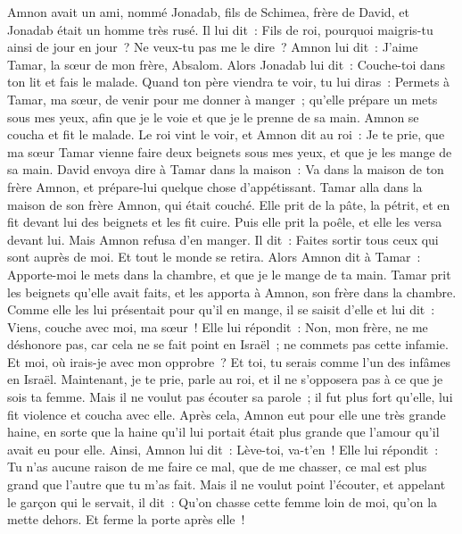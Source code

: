 \begin{multicols}{2}
Amnon avait un ami, nommé Jonadab, fils de Schimea, frère de David, et Jonadab était un homme très rusé.
Il lui dit~: Fils de roi, pourquoi maigris-tu ainsi de jour en jour~? Ne veux-tu pas me le dire~? Amnon lui dit~: J'aime Tamar, la sœur de mon frère, Absalom.
Alors Jonadab lui dit~: Couche-toi dans ton lit et fais le malade. Quand ton père viendra te voir, tu lui diras~: Permets à Tamar, ma sœur, de venir pour me donner à manger~; qu'elle prépare un mets sous mes yeux, afin que je le voie et que je le prenne de sa main.
Amnon se coucha et fit le malade. Le roi vint le voir, et Amnon dit au roi~: Je te prie, que ma sœur Tamar vienne faire deux beignets sous mes yeux, et que je les mange de sa main.
David envoya dire à Tamar dans la maison~: Va dans la maison de ton frère Amnon, et prépare-lui quelque chose d'appétissant.
Tamar alla dans la maison de son frère Amnon, qui était couché. Elle prit de la pâte, la pétrit, et en fit devant lui des beignets et les fit cuire.
Puis elle prit la poêle, et elle les versa devant lui. Mais Amnon refusa d'en manger. Il dit~: Faites sortir tous ceux qui sont auprès de moi. Et tout le monde se retira.
Alors Amnon dit à Tamar~: Apporte-moi le mets dans la chambre, et que je le mange de ta main. Tamar prit les beignets qu'elle avait faits, et les apporta à Amnon, son frère dans la chambre.
Comme elle les lui présentait pour qu'il en mange, il se saisit d'elle et lui dit~: Viens, couche avec moi, ma sœur~!
Elle lui répondit~: Non, mon frère, ne me déshonore pas, car cela ne se fait point en Israël~; ne commets pas cette infamie.
Et moi, où irais-je avec mon opprobre~? Et toi, tu serais comme l'un des infâmes en Israël. Maintenant, je te prie, parle au roi, et il ne s'opposera pas à ce que je sois ta femme.
Mais il ne voulut pas écouter sa parole~; il fut plus fort qu'elle, lui fit violence et coucha avec elle.
Après cela, Amnon eut pour elle une très grande haine, en sorte que la haine qu'il lui portait était plus grande que l'amour qu'il avait eu pour elle. Ainsi, Amnon lui dit~: Lève-toi, va-t'en~!
Elle lui répondit~: Tu n'as aucune raison de me faire ce mal, que de me chasser, ce mal est plus grand que l'autre que tu m'as fait.
Mais il ne voulut point l'écouter, et appelant le garçon qui le servait, il dit~: Qu'on chasse cette femme loin de moi, qu'on la mette dehors. Et ferme la porte après elle~!

\end{multicols}
